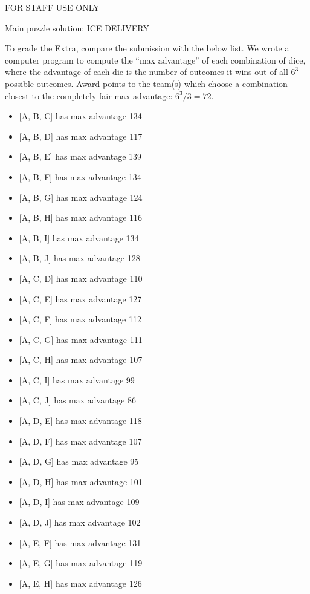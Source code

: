\begin{puzzleSolutions}
FOR STAFF USE ONLY

Main puzzle solution: ICE DELIVERY

To grade the Extra, compare the submission with the below list.
We wrote a computer program to compute the ``max advantage'' of each combination
of dice, where the advantage of each die is the number of outcomes it wins
out of all \(6^3\) possible outcomes.
Award points to the team(s) which choose a combination closest to
the completely fair max advantage: \(6^3/3=72\).

\begin{multicols}{2}\small
\begin{itemize}
\item{} [A, B, C] has max advantage 134
\item{} [A, B, D] has max advantage 117
\item{} [A, B, E] has max advantage 139
\item{} [A, B, F] has max advantage 134
\item{} [A, B, G] has max advantage 124
\item{} [A, B, H] has max advantage 116
\item{} [A, B, I] has max advantage 134
\item{} [A, B, J] has max advantage 128
\item{} [A, C, D] has max advantage 110
\item{} [A, C, E] has max advantage 127
\item{} [A, C, F] has max advantage 112
\item{} [A, C, G] has max advantage 111
\item{} [A, C, H] has max advantage 107
\item{} [A, C, I] has max advantage 99
\item{} [A, C, J] has max advantage 86
\item{} [A, D, E] has max advantage 118
\item{} [A, D, F] has max advantage 107
\item{} [A, D, G] has max advantage 95
\item{} [A, D, H] has max advantage 101
\item{} [A, D, I] has max advantage 109
\item{} [A, D, J] has max advantage 102
\item{} [A, E, F] has max advantage 131
\item{} [A, E, G] has max advantage 119
\item{} [A, E, H] has max advantage 126

\end{itemize}
\end{multicols}
\end{puzzleSolutions}
